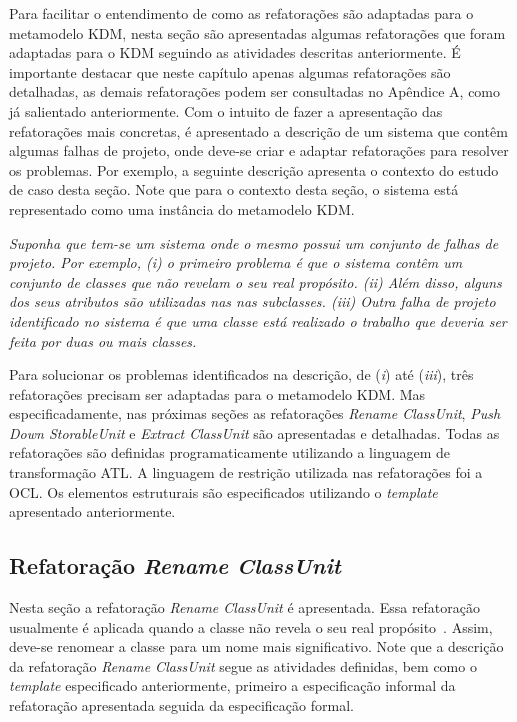 Para facilitar o entendimento de como as refatorações são adaptadas para o metamodelo KDM, nesta seção são apresentadas algumas refatorações que foram adaptadas para o KDM seguindo as atividades descritas anteriormente. É importante destacar que neste capítulo apenas algumas refatorações são detalhadas, as demais refatorações podem ser consultadas no Apêndice A, como já salientado anteriormente. Com o intuito de fazer a apresentação das refatorações mais concretas, é apresentado a descrição de um sistema que contêm algumas falhas de projeto, onde deve-se criar e adaptar refatorações para resolver os problemas. Por exemplo, a seguinte descrição apresenta o contexto do estudo de caso desta seção. Note que para o contexto desta seção, o sistema está representado como uma instância do metamodelo KDM.

\textit{Suponha que tem-se um sistema onde o mesmo possui um conjunto de falhas de projeto. Por exemplo, (\textit{i}) o primeiro problema é que o sistema contêm um conjunto de classes que não revelam o seu real propósito. (\textit{ii}) Além disso, alguns dos seus atributos são utilizadas nas nas subclasses. (\textit{iii}) Outra falha de projeto identificado no sistema é que uma classe está realizado o trabalho que deveria ser feita por duas ou mais classes.}

Para solucionar os problemas identificados na descrição, de (\textit{i}) até (\textit{iii}), três refatorações precisam ser adaptadas para o metamodelo KDM. Mas especificadamente, nas próximas seções as refatorações \textit{Rename ClassUnit}, \textit{Push Down StorableUnit} e \textit{Extract ClassUnit} são apresentadas e detalhadas. Todas as refatorações são definidas programaticamente utilizando a linguagem de transformação ATL. A linguagem de restrição utilizada nas refatorações foi a OCL. Os elementos estruturais são especificados utilizando o \textit{template} apresentado anteriormente.

\subsection{Refatoração \textit{Rename ClassUnit}}
Nesta seção a refatoração \textit{Rename ClassUnit} é apresentada. Essa refatoração usualmente é aplicada quando a classe não revela o seu real propósito~\cite{Fowler1999}. Assim, deve-se renomear a classe para um nome mais significativo. Note que a descrição da refatoração \textit{Rename ClassUnit} segue as atividades definidas, bem como o \textit{template} especificado anteriormente, primeiro a especificação informal da refatoração apresentada seguida da especificação formal.

